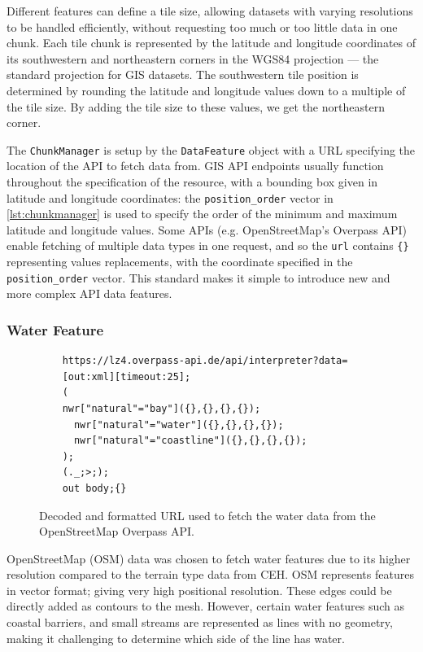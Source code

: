 \documentclass[12pt]{article}
\begin{document}
Different features can define a tile size, allowing datasets with varying resolutions to be handled efficiently, without requesting too much or too little data in one chunk. Each tile chunk is represented by the latitude and longitude coordinates of its southwestern and northeastern corners in the WGS84 projection --- the standard projection for GIS datasets. The southwestern tile position is determined by rounding the latitude and longitude values down to a multiple of the tile size. By adding the tile size to these values, we get the northeastern corner.

The \texttt{ChunkManager} is setup by the \texttt{DataFeature} object with a URL specifying the location of the API to fetch data from. GIS API endpoints usually function throughout the specification of the resource, with a bounding box given in latitude and longitude coordinates: the \texttt{position\_order} vector in \autoref{lst:chunkmanager} is used to specify the order of the minimum and maximum latitude and longitude values. Some APIs (e.g. OpenStreetMap's Overpass API) enable fetching of multiple data types in one request, and so the \texttt{url} contains \texttt{\{\}} representing values replacements, with the coordinate specified in the \texttt{position\_order} vector. This standard makes it simple to introduce new and more complex API data features.

\subsubsection{Water Feature}

\begin{figure}[H]
  \centering
  \begin{lstlisting}
	https://lz4.overpass-api.de/api/interpreter?data=
	[out:xml][timeout:25];
	(
    nwr["natural"="bay"]({},{},{},{});
	  nwr["natural"="water"]({},{},{},{});
	  nwr["natural"="coastline"]({},{},{},{});
	);
	(._;>;);
	out body;{}
	\end{lstlisting}
  \vspace{-2em}
  \caption{Decoded and formatted URL used to fetch the water data from the OpenStreetMap Overpass API.}
  \label{url:water}
\end{figure}

OpenStreetMap (OSM) data was chosen to fetch water features due to its higher resolution compared to the terrain type data from CEH. OSM represents features in vector format; giving very high positional resolution. These edges could be directly added as contours to the mesh. However, certain water features such as coastal barriers, and small streams are represented as lines with no geometry, making it challenging to determine which side of the line has water.
\end{document}

